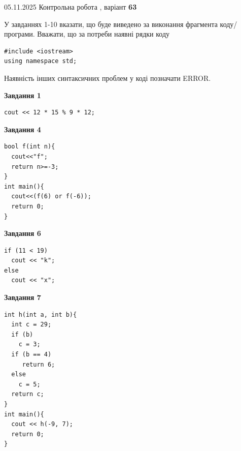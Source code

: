 \documentclass[12pt, ukrainian]{article}
\begin{document}
{\Large{05.11.2025 Контрольна робота , варіант  \No \textbf { 63 }\par}}
{
\begin {large}
У завданнях 1-10 вказати, що буде виведено за виконання фрагмента коду/про\-гра\-ми.
Вважати, що за потреби наявні рядки коду
\begin{verbatim}
#include <iostream>
using namespace std;
\end{verbatim}
Наявність інших синтаксичних проблем у коді позначати ERROR.

\begin{minipage}[t]{7.0cm}

\begin{center}
\textbf{Завдання 1}
\end{center}
\vspace{-8mm}

\begin{verbatim}
cout << 12 * 15 % 9 * 12;
\end{verbatim}



\begin{center}
\textbf{Завдання 4}
\end{center}
\vspace{-8mm}

\begin{verbatim}
bool f(int n){
  cout<<"f";
  return n>=-3;
}
int main(){
  cout<<(f(6) or f(-6));
  return 0;
}
\end{verbatim}



\begin{center}
\textbf{Завдання 6}
\end{center}
\vspace{-8mm}

\begin{verbatim}
if (11 < 19)
  cout << "k";
else
  cout << "x";
\end{verbatim}



\begin{center}
\textbf{Завдання 7}
\end{center}
\vspace{-8mm}

\begin{verbatim}
int h(int a, int b){
  int c = 29;
  if (b)
    c = 3;
  if (b == 4)
     return 6;
  else
    c = 5;
  return c;
}
int main(){
  cout << h(-9, 7);
  return 0;
}
\end{verbatim}


\end{minipage}
\end{large}}
\end{document}
